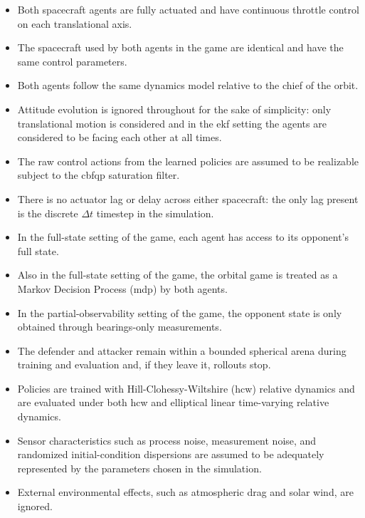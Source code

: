 \begin{itemize}
    \item Both spacecraft agents are fully actuated and have continuous throttle control on each translational axis.
    \item The spacecraft used by both agents in the game are identical and have the same control parameters.
    \item Both agents follow the same dynamics model relative to the chief of the orbit.
    \item Attitude evolution is ignored throughout for the sake of simplicity: only translational motion is considered and in the \acs{ekf} setting the agents are considered to be facing each other at all times.
    \item The raw control actions from the learned policies are assumed to be realizable subject to the \acs{cbfqp} saturation filter.
    \item There is no actuator lag or delay across either spacecraft: the only lag present is the discrete $\Delta t$ timestep in the simulation.
    \item In the full-state setting of the game, each agent has access to its opponent's full state.
    \item Also in the full-state setting of the game, the orbital game is treated as a Markov Decision Process (\acs{mdp}) by both agents.
    \item In the partial-observability setting of the game, the opponent state is only obtained through bearings-only measurements.
    \item The defender and attacker remain within a bounded spherical arena during training and evaluation and, if they leave it, rollouts stop.
    \item Policies are trained with Hill-Clohessy-Wiltshire (\acs{hcw}) relative dynamics and are evaluated under both \acs{hcw} and elliptical linear time-varying relative dynamics.
    \item Sensor characteristics such as process noise, measurement noise, and randomized initial-condition dispersions are assumed to be adequately represented by the parameters chosen in the simulation.
    \item External environmental effects, such as atmospheric drag and solar wind, are ignored.
\end{itemize}
